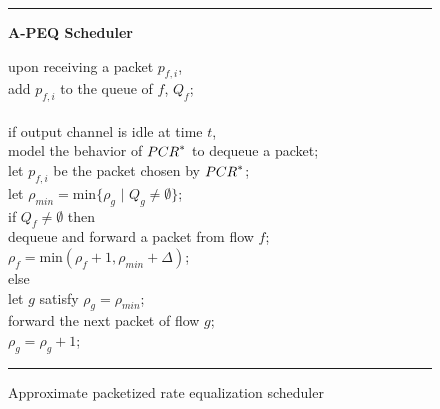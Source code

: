 
\begin{figure}
\noindent
\rule{\columnwidth}{0.5mm}
\centerline{\bf A-PEQ Scheduler}
\begin{tabbing}
\settabs
upon receiving a packet $p_{f,i}$,\\
\tea add $p_{f,i}$ to the queue of $f$, $Q_f$;\\
\\
if output channel is idle at time $t$,\\
\tea model the behavior of ${PCR}^{*}$ to dequeue a packet;\\
\tea let $p_{f,i}$ be the packet chosen by ${PCR}^{*}$;\\
\tea let $\rho_{min} = \mbox{min}\{\rho_g \,\,|\,\, Q_g \neq \emptyset\}$;\\
\tea if $Q_f \neq \emptyset$ then\\
\teb    dequeue and forward a packet from flow $f$;\\
\teb    $\rho_f = \mbox{min}(\rho_f+1,\rho_{min}+\Delta)$;\\
\tea else\\
\teb    let $g$ satisfy $\rho_g = \rho_{min}$;\\
\teb    forward the next packet of flow $g$;\\
\teb    $\rho_g = \rho_g + 1$;\\


\end{tabbing}
\caption{Approximate packetized rate equalization scheduler}
\label{fig:A-PEQ-Scheduler}
\rule{\columnwidth}{0.5mm}
\end{figure}


